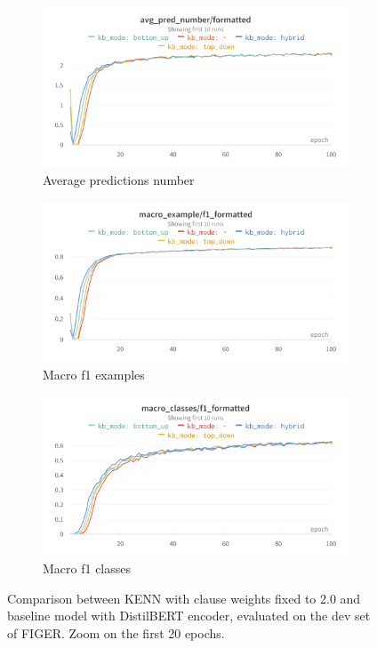\begin{figure}
     \centering
     \begin{subfigure}{0.8\textwidth}
         \centering
         \includegraphics[width=\textwidth]{figures/wandb_modes_avg_pred.png}
         \caption{Average predictions number}
     \end{subfigure}
     \begin{subfigure}{0.8\textwidth}
         \centering
         \includegraphics[width=\textwidth]{figures/wandb_modes_macro_ex_f1.png}
         \caption{Macro f1 examples}
     \end{subfigure}
     \begin{subfigure}{0.8\textwidth}
         \centering
         \includegraphics[width=\textwidth]{figures/wandb_modes_macro_class_f1.png}
         \caption{Macro f1 classes}
     \end{subfigure}
        \caption{Comparison between KENN with clause weights fixed to 2.0 and baseline model with DistilBERT encoder, evaluated on the dev set of FIGER. Zoom on the first 20 epochs.}
        \label{fig:wandb_modes_comparison}
\end{figure}

